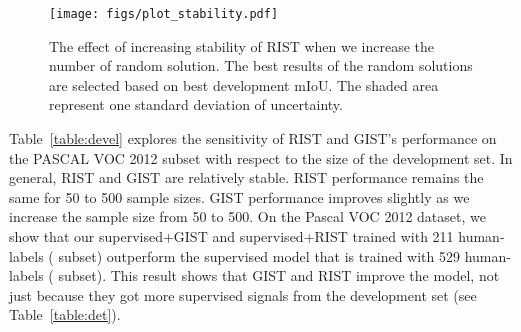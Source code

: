 \documentclass[10pt, conference, compsocconf]{IEEEtran}
\begin{document}
\begin{figure}[!htb]
  \centering
  \texttt{[image: figs/plot\_stability.pdf]}
  \caption{The effect of increasing stability of RIST when we increase the number of random solution. The best results of the random solutions are selected based on best development mIoU. The shaded area represent one standard deviation of uncertainty.
  }
  \label{fig:stable}
\end{figure}

\begin{table}[!htb]
\centering
\setlength{\tabcolsep}{13pt}
\bigskip
\caption{Semantic segmentation results on the PASCAL VOC 2012 validation set for RIST and GIST based on best epoch selected while varying the number of examples in the development set.}
\label{table:devel}
\end{table}

\begin{table}[!htb]
\centering
\setlength{\tabcolsep}{5pt}
\bigskip
\caption{Semantic segmentation results on the PASCAL VOC 2012 validation set for GIST on different beam size. selection choices at each stage are P (pseudo-label only) or L (human-label only).}
\label{table:gist_beam}
\end{table}

Table~\ref{table:devel} explores the sensitivity of RIST and GIST's performance on the PASCAL VOC 2012  subset with respect to the size of the development set. In general, RIST and GIST are relatively stable. RIST performance remains the same for 50 to 500 sample sizes. GIST performance improves slightly as we increase the sample size from 50 to 500.
On the Pascal VOC 2012 dataset, we show that our supervised+GIST and supervised+RIST trained with 211 human-labels ( subset) outperform the supervised model that is trained with 529 human-labels ( subset). This result shows that GIST and RIST improve the model, not just because they got more supervised signals from the development set (see Table~\ref{table:det}).
\end{document}
